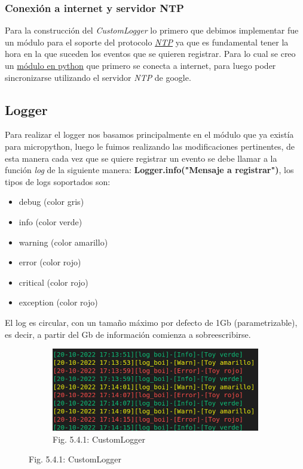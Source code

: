 \documentclass[12pt]{article}
\begin{document}
\subsubsection{Conexión a internet y servidor NTP}
Para la construcción del \textit{CustomLogger} lo primero que debimos implementar fue un módulo para el soporte del protocolo \href{https://es.wikipedia.org/wiki/Network_Time_Protocol}{\textit{NTP}} ya que es fundamental tener la hora en la que suceden los eventos que se quieren registrar. Para lo cual se creo un \href{https://github.com/sofia-am/DJI_Payload_Development/blob/main/log/micropython/lib/us_ntp.py}{módulo en python} que primero se conecta a internet, para luego poder sincronizarse utilizando el servidor \textit{NTP} de google.

\subsection{Logger}
Para realizar el logger nos basamos principalmente en el módulo que ya existía para micropython, luego le fuimos realizando las modificaciones pertinentes, de esta manera cada vez que se quiere registrar un evento se debe llamar a la función \textit{log} de la siguiente manera: \textbf{Logger.info("Mensaje a registrar")}, los tipos de logs soportados son:
\begin{itemize}
  \item debug (color gris)
  \item info (color verde)
  \item warning (color amarillo)
  \item error (color rojo)
  \item critical (color rojo)
  \item exception (color rojo)
\end{itemize}
El log es circular, con un tamaño máximo por defecto de 1Gb (parametrizable), es decir, a partir del Gb de información comienza a sobreescribirse.

\begin{figure}[ht]
  \centering
  \begin{subfigure}[a]{1\linewidth}
    \includegraphics[width=\linewidth]{images/PyCom-Logger.png}
    \caption{Fig. 5.4.1: CustomLogger}
  \end{subfigure}
\end{figure}
\end{document}
